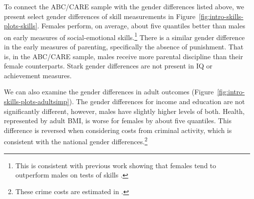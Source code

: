 To connect the ABC/CARE sample with the gender differences listed above, we present select gender differences of skill measurements in Figure~\ref{fig:intro-skills-plots-skills}. Females perform, on average, about five quantiles better than males on early measures of social-emotional skills.\footnote{This is consistent with previous work showing that females tend to outperform males on tests of skills \citep{Baker-Milligan_2013_Boy-Girl-Differences}.} There is a similar gender difference in the early measures of parenting, specifically the absence of punishment. That is, in the ABC/CARE sample, males receive more parental discipline than their female counterparts. Stark gender differences are not present in IQ or achievement measures. 

We can also examine the gender differences in adult outcomes (Figure~\ref{fig:intro-skills-plots-adultsimp}). The gender differences for income and education are not significantly different, however, males have slightly higher levels of both. Health, represented by adult BMI, is worse for females by about five quantiles. This difference is reversed when considering costs from criminal activity, which is consistent with the national gender differences.\footnote{These crime costs are estimated in \citet{Garcia_Heckman_Leaf_etal_2017_Comp_CBA_Unpublished}.} 

